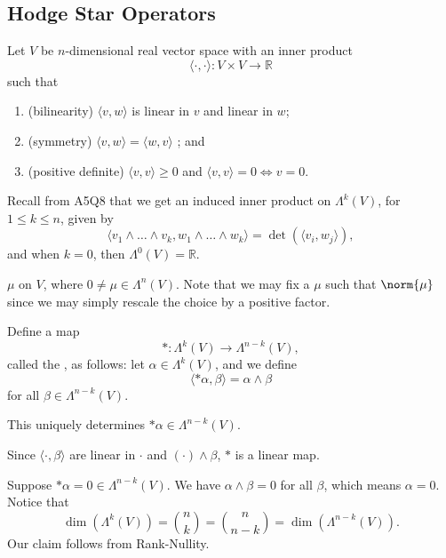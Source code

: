 \documentclass[notoc,notitlepage]{tufte-book}
\begin{document}
\subsection{Hodge Star Operators}%
\label{sub:hodge_star_operators}

Let $V$ be $n$-dimensional real vector space with an inner product
\begin{equation*}
  \langle \cdot, \cdot \rangle : V \times V \to \mathbb{R}
\end{equation*}
such that
\begin{enumerate}
  \item (bilinearity) $\langle v, w \rangle$ is linear in $v$ and linear in $w$;
  \item (symmetry) $\langle v, w \rangle = \langle w, v \rangle$ ; and
  \item (positive definite) $\langle v, v \rangle \geq 0$ and $\langle v, v
    \rangle = 0 \iff v = 0$.
\end{enumerate}

Recall from A5Q8 that we get an induced inner product on $\Lambda^k(V)$, for $1
\leq k \leq n$, given by
\begin{equation*}
  \langle v_1 \land \hdots \land v_k, w_1 \land \hdots \land w_k \rangle = \det
  (\langle v_i, w_j \rangle),
\end{equation*}
and when $k = 0$, then $\Lambda^0(V) = \mathbb{R}$.

 $\mu$ on $V$, where $0 \neq \mu \in
\Lambda^n(V)$. Note that we may fix a $\mu$ such that $\norm{\mu}$ since we may
simply rescale the choice by a positive factor.

\begin{defn}\label{defn:hodge_star_operator}
  Define a map
  \begin{equation*}
    * : \Lambda^k(V) \to \Lambda^{n-k}(V),
  \end{equation*}
  called the , as follows: let $\alpha \in
  \Lambda^k(V)$, and we define
  \begin{equation*}
    \langle * \alpha, \beta \rangle = \alpha \land \beta
  \end{equation*}
  for all $\beta \in \Lambda^{n-k}(V)$.
\end{defn}

\begin{note}
  This uniquely determines $*\alpha \in \Lambda^{n-k}(V)$.

  Since $\langle \cdot, \beta \rangle$ are linear in $\cdot$ and $(\cdot) \land
  \beta$, $*$ is a linear map.

  \noindent
   Suppose $* \alpha = 0 \in
  \Lambda^{n-k}(V)$. We have  $\alpha \land \beta = 0$ for all $\beta$, which
  means $\alpha = 0$. Notice that
   \begin{equation*}
     \dim (\Lambda^k(V)) = \binom{n}{k} = \binom{n}{n-k} =
     \dim(\Lambda^{n-k}(V)).
  \end{equation*}
  Our claim follows from Rank-Nullity.
\end{note}
\end{document}
